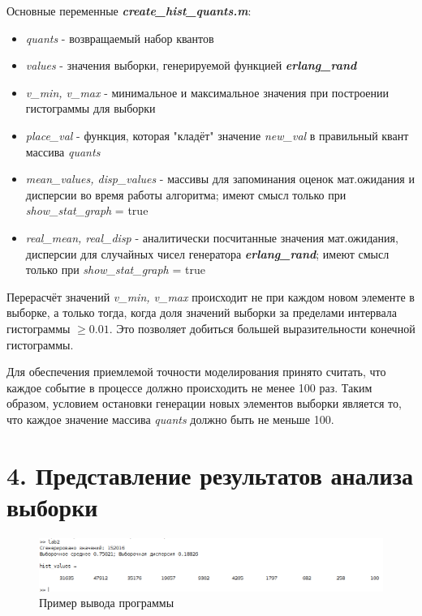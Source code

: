 \documentclass[12pt]{article}
\begin{document}
Основные переменные \textbf{\textit{create\_hist\_quants.m}}:
\begin{itemize}
	\item \textit{quants} - возвращаемый набор квантов
	\item \textit{values} - значения выборки, генерируемой функцией \textbf{\textit{erlang\_rand}}
	\item \textit{v\_min, v\_max} - минимальное и максимальное значения при построении гистограммы для выборки
	\item \textit{place\_val} - функция, которая "кладёт" значение \textit{new\_val} в правильный квант массива \textit{quants}
	\item \textit{mean\_values, disp\_values} - массивы для запоминания оценок мат.ожидания и дисперсии во время работы алгоритма; имеют смысл только при \textit{show\_stat\_graph} = true
	\item \textit{real\_mean, real\_disp} - аналитически посчитанные значения мат.ожидания, дисперсии для случайных чисел генератора \textbf{\textit{erlang\_rand}}; имеют смысл только при \textit{show\_stat\_graph} = true\\
\end{itemize}

Перерасчёт значений \textit{v\_min, v\_max} происходит не при каждом новом элементе в выборке, а только тогда, когда доля значений выборки за пределами интервала гистограммы $\geq 0.01$. Это позволяет добиться большей выразительности конечной гистограммы.

Для обеспечения приемлемой точности моделирования принято считать, что каждое событие в процессе должно происходить не менее 100 раз. Таким образом, условием остановки генерации новых элементов выборки является то, что каждое значение массива \textit{quants} должно быть не меньше 100.

\newpage
 \section*{4. Представление результатов анализа выборки}
 
 \begin{figure}[!h]
	\centering
	\includegraphics[width=\linewidth]{hist_values_example.png}
	\caption{Пример вывода программы}
\end{figure}
\end{document}
